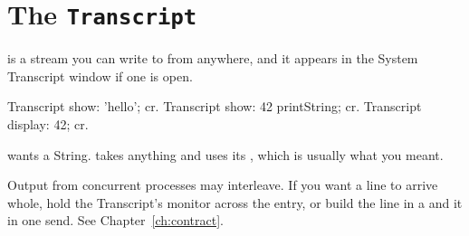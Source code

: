 \section{The \texttt{Transcript}}

 is a stream you can write to from anywhere, and it appears in
the System Transcript window if one is open.

\begin{st}
Transcript show: 'hello'; cr.
Transcript show: 42 printString; cr.
Transcript display: 42; cr.
\end{st}

 wants a String.  takes anything and uses its
, which is usually what you meant.

\begin{stwarn}
Output from concurrent processes may interleave. If you want a line to arrive
whole, hold the Transcript's monitor across the entry, or build the line in a
 and  it in one send. See
Chapter~\ref{ch:contract}.
\end{stwarn}
